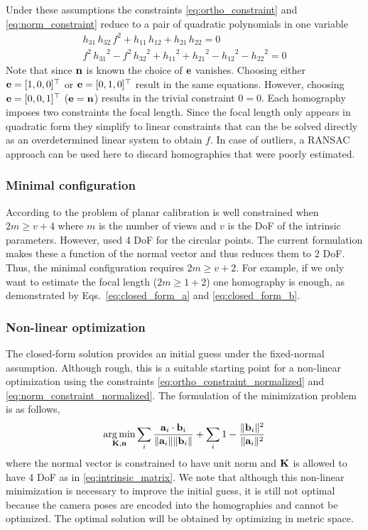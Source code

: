 \documentclass[10pt,twocolumn,letterpaper]{article}
\begin{document}
Under these assumptions the constraints \eqref{eq:ortho_constraint} and \eqref{eq:norm_constraint} reduce to a pair of quadratic polynomials in one variable 
\begin{align}
h_{31}\, h_{32}\, f^2 + h_{11}\, h_{12} + h_{21}\, h_{22}=0
\label{eq:closed_form_a}
\\
f^2\, {h_{31}}^2 - f^2\, {h_{32}}^2 + {h_{11}}^2 + {h_{21}}^2 - {h_{12}}^2 - {h_{22}}^2=0
\label{eq:closed_form_b}
\end{align}
Note that since $\mathbf{n}$ is known the choice of $\mathbf{e}$ vanishes. Choosing either $\mathbf{e}=[1,0,0]^\top$ or $\mathbf{e}=[0,1,0]^\top$ result in the same equations. However, choosing $\mathbf{e}=[0,0,1]^\top$ (\ie $\mathbf{e}=\mathbf{n}$) results in the trivial constraint $0=0$. Each homography imposes two constraints the focal length. Since the focal length only appears in quadratic form they simplify to linear constraints that can the be solved directly as an overdetermined linear system to obtain $f$. In case of outliers, a RANSAC approach can be used here to discard homographies that were poorly estimated.

\subsubsection{Minimal configuration}

According to \cite{hartley2000} the problem of planar calibration is well constrained when $2m \geq v+4$ where $m$ is the number of views and $v$ is the DoF of the intrinsic parameters. However, \cite{hartley2000} used 4 DoF for the circular points. The current formulation makes these a function of the normal vector and thus reduces them to 2 DoF. Thus, the minimal configuration requires $2m \geq v+2$. For example, if we only want to estimate the focal length ($2m \geq 1+2$) one homography is enough, as demonstrated by Eqs.~\eqref{eq:closed_form_a} and \eqref{eq:closed_form_b}.

\subsubsection{Non-linear optimization}

The closed-form solution provides an initial guess under the fixed-normal assumption. Although rough, this is a suitable starting point for a non-linear optimization using the constraints \eqref{eq:ortho_constraint_normalized} and \eqref{eq:norm_constraint_normalized}. The formulation of the minimization problem is as follows, 
%
\begin{align}
\operatorname*{arg\,min}_{\mathbf{K},\mathbf{n}} 
\sum_i 
\frac{\mathbf{a}_i \cdot \mathbf{b}_i}{\lVert\mathbf{a}_i\rVert \lVert\mathbf{b}_i\rVert} +
\sum_i 
1 - \frac{\lVert\mathbf{b}_i\rVert^2}{\lVert\mathbf{a}_i\rVert^2}
\end{align}
%
where the normal vector is constrained to have unit norm and $\mathbf{K}$ is allowed to have 4 DoF as in \eqref{eq:intrinsic_matrix}. We note that although this non-linear minimization is necessary to improve the initial guess, it is still not optimal because the camera poses are encoded into the homographies and cannot be optimized. The optimal solution will be obtained by optimizing in metric space.
\end{document}
